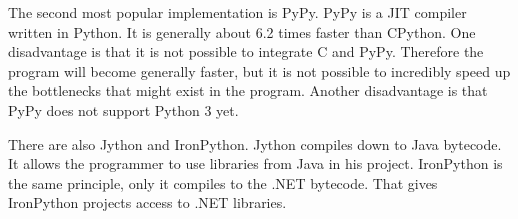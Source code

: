 
The second most popular implementation is PyPy. PyPy is a JIT compiler written
in Python. It is generally about 6.2 times faster than CPython. One disadvantage
is that it is not possible to integrate C and PyPy. Therefore the program will
become generally faster, but it is not possible to incredibly speed up the
bottlenecks that might exist in the program.\cite{website:python-pypy-speed} Another
disadvantage is that PyPy does not support Python 3 yet.\cite{website:python-pypy,website:python-pypy2}

There are also Jython and IronPython. Jython compiles down to Java bytecode. It
allows the programmer to use libraries from Java in his project. IronPython is
the same principle, only it compiles to the .NET bytecode. That gives IronPython
projects access to .NET libraries.

